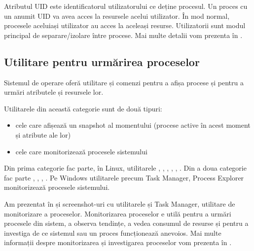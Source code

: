 
Atributul UID  este identificatorul utilizatorului ce
deține procesul. Un proces cu un anumit UID va avea acces la resursele acelui
utilizator. În mod normal, procesele aceluiași utilizator au acces la aceleași
resurse. Utilizatorii sunt modul principal de separare/izolare între procese.
Mai multe detalii vom prezenta în .

\subsection{Utilitare pentru urmărirea proceselor}
\label{sec:process:monitoring}

Sistemul de operare oferă utilitare și comenzi pentru a afișa
procese și pentru a urmări atributele și resursele lor.

Utilitarele din această categorie sunt de două tipuri:

\begin{itemize}
	\item cele care afișează un snapshot al momentului (procese active în
		acest moment și atribute ale lor)
	\item cele care monitorizează procesele sistemului
\end{itemize}

Din prima categorie fac parte, în Linux, utilitarele , , , ,
, . Din a doua categorie fac parte , , , . Pe Windows
utilitarele precum Task Manager, Process Explorer monitorizează procesele
sistemului.

Am prezentat în  și  screenshot-uri cu utilitarele  și Task Manager, utilitare de monitorizare a proceselor. Monitorizarea
proceselor e utilă pentru a urmări procesele din sistem, a observa tendințe, a
vedea consumul de resurse și pentru a investiga de ce sistemul sau un proces
funcționează anevoios. Mai multe informații despre monitorizarea și investigarea
proceselor vom prezenta în .

